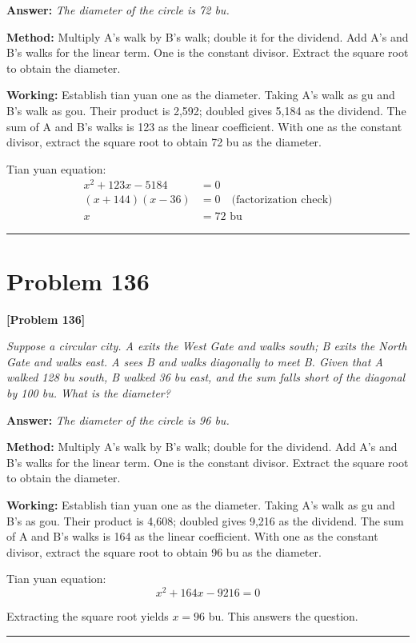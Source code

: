 \documentclass[11pt,a4paper]{book}
\newcommand{\answer}[1]{\noindent\textbf{\color{anacolor}Answer: }\textit{#1}\par}
\newcommand{\method}[1]{\noindent\textbf{\color{methodcolor}Method: }#1\par}
\newcommand{\working}[1]{\noindent\textbf{\color{workcolor}Working: }#1\par}
\newcommand{\shortline}{\noindent\rule{0.5\textwidth}{0.4pt}\par}
\begin{document}
\answer{The diameter of the circle is 72 bu.}

\method{Multiply A's walk by B's walk; double it for the dividend. Add A's and B's walks for the linear term. One is the constant divisor. Extract the square root to obtain the diameter.}

\working{Establish tian yuan one as the diameter. Taking A's walk as gu and B's walk as gou. Their product is 2,592; doubled gives 5,184 as the dividend. The sum of A and B's walks is 123 as the linear coefficient. With one as the constant divisor, extract the square root to obtain 72 bu as the diameter.

Tian yuan equation:
\begin{align*}
x^2 + 123x - 5184 &= 0 \\
(x + 144)(x - 36) &= 0 \quad \text{(factorization check)} \\
x &= 72 \text{ bu}
\end{align*}}

\shortline

\section{Problem 136}
\label{sec:prob136}

\noindent\textbf{\color{probcolor}[Problem 136]}

\textit{Suppose a circular city. A exits the West Gate and walks south; B exits the North Gate and walks east. A sees B and walks diagonally to meet B. Given that A walked 128 bu south, B walked 36 bu east, and the sum falls short of the diagonal by 100 bu. What is the diameter?}

\answer{The diameter of the circle is 96 bu.}

\method{Multiply A's walk by B's walk; double for the dividend. Add A's and B's walks for the linear term. One is the constant divisor. Extract the square root to obtain the diameter.}

\working{Establish tian yuan one as the diameter. Taking A's walk as gu and B's as gou. Their product is 4,608; doubled gives 9,216 as the dividend. The sum of A and B's walks is 164 as the linear coefficient. With one as the constant divisor, extract the square root to obtain 96 bu as the diameter.

Tian yuan equation:
$$x^2 + 164x - 9216 = 0$$

Extracting the square root yields $x = 96$ bu. This answers the question.}

\shortline
\end{document}
